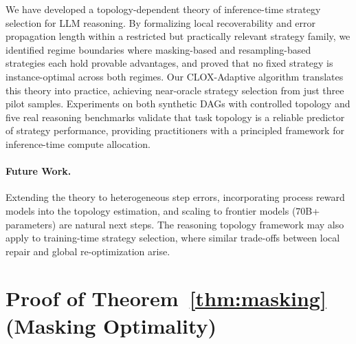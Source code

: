 \documentclass{article}
\begin{document}
We have developed a topology-dependent theory of inference-time strategy selection for LLM reasoning. By formalizing local recoverability and error propagation length within a restricted but practically relevant strategy family, we identified regime boundaries where masking-based and resampling-based strategies each hold provable advantages, and proved that no fixed strategy is instance-optimal across both regimes. Our CLOX-Adaptive algorithm translates this theory into practice, achieving near-oracle strategy selection from just three pilot samples. Experiments on both synthetic DAGs with controlled topology and five real reasoning benchmarks validate that task topology is a reliable predictor of strategy performance, providing practitioners with a principled framework for inference-time compute allocation.

\paragraph{Future Work.} Extending the theory to heterogeneous step errors, incorporating process reward models into the topology estimation, and scaling to frontier models (70B+ parameters) are natural next steps. The reasoning topology framework may also apply to training-time strategy selection, where similar trade-offs between local repair and global re-optimization arise.




\newpage
\appendix
\section{Proof of Theorem~\ref{thm:masking} (Masking Optimality)}
\label{app:proof_masking}
\end{document}
